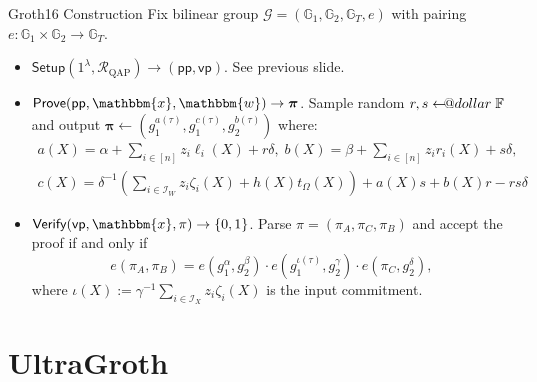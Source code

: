 \documentclass{zkdl-presentation-template}
\makeatletter
\newcommand\leftarrowS{\leftarrow\joinrel\smalldollar}
\newcommand{\smalldollar}{\mathrel{\mathpalette\small@dollar\relax}}
\newcommand{\small@dollar}[2]{%
  \vcenter{\hbox{%
    $#1\textnormal{\fontsize{0.7\dimexpr\f@size pt}{0}\selectfont\$}$%
  }}%
}
\makeatother
\begin{document}
    \begin{frame}{Groth16 Construction}
        Fix bilinear group $\mathcal{G} = (\mathbb{G}_1, \mathbb{G}_2,
        \mathbb{G}_T,e)$ with pairing $e: \mathbb{G}_1 \times \mathbb{G}_2 \to
        \mathbb{G}_T$.

        \begin{itemize}
            \item $\textsf{Setup}(1^{\lambda},\mathcal{R}_{\text{QAP}}) \to (\textsf{pp},\textsf{vp})$. See previous slide.
            \item $\textsf{Prove}(\textsf{pp},\mathbbm{x}, \mathbbm{w}) \to \boldsymbol{\pi}$. Sample random 
            $r,s \leftarrowS \mathbb{F}$ and output $\boldsymbol{\pi} \gets (g_1^{a(\tau)}, g_1^{c(\tau)}, g_2^{b(\tau)})$ where:
            \begin{gather*}
                a(X) = \alpha + \sum_{i \in [n]}z_i\ell_i(X) + r\delta, \; b(X) = \beta + \sum_{i \in [n]}z_ir_i(X) + s\delta, \\
                c(X) = \delta^{-1}\left(\sum_{i \in \mathcal{I}_W} z_i\zeta_i(X)+h(X)t_{\Omega}(X)\right) + a(X)s + b(X)r - rs\delta
            \end{gather*}
             \item $\textsf{Verify}(\textsf{vp},\mathbbm{x},\pi) \to \{0,1\}$. Parse $\pi=(\pi_A,\pi_C,\pi_B)$ and 
            accept the proof if and only if
            \begin{equation*}
                e(\pi_A,\pi_B) = e(g_1^{\alpha},g_2^{\beta}) \cdot e(g_1^{\iota(\tau)}, g_2^{\gamma}) \cdot e(\pi_C, g_2^{\delta}),
            \end{equation*}
            where $\iota(X) := \gamma^{-1}\sum_{i \in
            \mathcal{I}_X}z_i\zeta_i(X)$ is the input commitment.
        \end{itemize}
    \end{frame}

    \section{UltraGroth}
\end{document}
